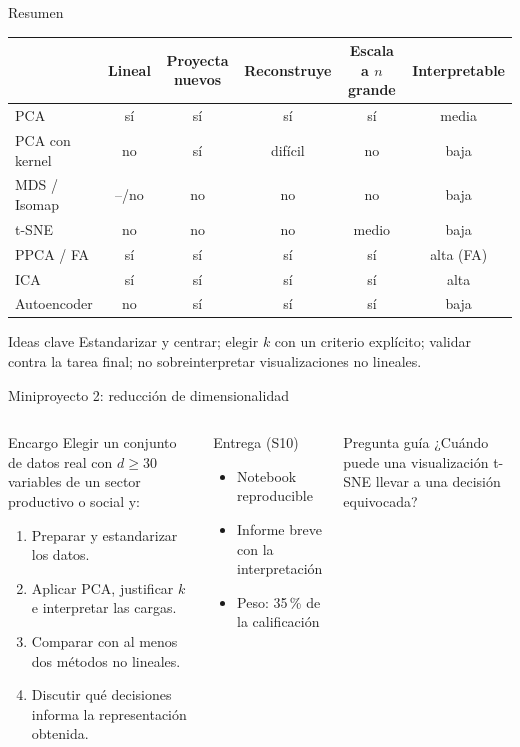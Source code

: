 \documentclass[aspectratio=169,11pt]{beamer}
\begin{document}
\begin{frame}{Resumen}
  \renewcommand{\arraystretch}{1.2}
  \small
  \begin{tabular}{@{}lccccc@{}}
    \toprule
    & \textbf{Lineal} & \textbf{Proyecta nuevos} & \textbf{Reconstruye} & \textbf{Escala a $n$ grande} & \textbf{Interpretable}\\
    \midrule
    PCA            & sí & sí & sí & sí & media \\
    PCA con kernel & no & sí & difícil & no & baja \\
    MDS / Isomap   & --/no & no & no & no & baja \\
    t-SNE          & no & no & no & medio & baja \\
    PPCA / FA      & sí & sí & sí & sí & alta (FA) \\
    ICA            & sí & sí & sí & sí & alta \\
    Autoencoder    & no & sí & sí & sí & baja \\
    \bottomrule
  \end{tabular}
  \vspace{8pt}
  \begin{block}{Ideas clave}
    Estandarizar y centrar; elegir $k$ con un criterio explícito; validar contra la tarea final;
    no sobreinterpretar visualizaciones no lineales.
  \end{block}
\end{frame}

\begin{frame}{Miniproyecto 2: reducción de dimensionalidad}
  \begin{columns}[T]
    \begin{block}{Encargo}
      Elegir un conjunto de datos real con $d \ge 30$ variables de un sector productivo
      o social y:
      \begin{enumerate}
        \item Preparar y estandarizar los datos.
        \item Aplicar PCA, justificar $k$ e interpretar las cargas.
        \item Comparar con al menos dos métodos no lineales.
        \item Discutir qué decisiones informa la representación obtenida.
      \end{enumerate}
    \end{block}
    \begin{exampleblock}{Entrega (S10)}
      \begin{itemize}
        \item Notebook reproducible
        \item Informe breve con la interpretación
        \item Peso: 35\,\% de la calificación
      \end{itemize}
    \end{exampleblock}
    \begin{alertblock}{Pregunta guía}
      ¿Cuándo puede una visualización t-SNE llevar a una decisión equivocada?
    \end{alertblock}
  \end{columns}
\end{frame}
\end{document}
